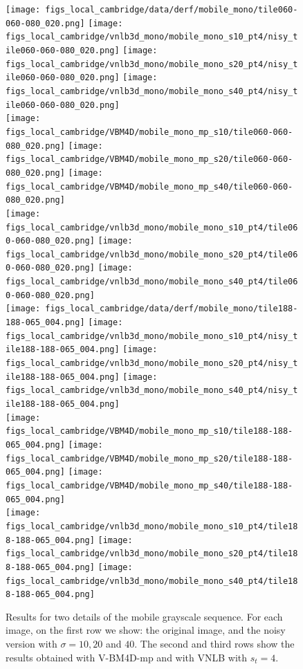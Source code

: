 \documentclass[10pt, journal, twocolumn, final, a4paper]{IEEEtran}
\begin{document}
\begin{figure}[htpb!]
	\centering
	\texttt{[image: figs\_local\_cambridge/data/derf/mobile\_mono/tile060-060-080\_020.png]}%
	\texttt{[image: figs\_local\_cambridge/vnlb3d\_mono/mobile\_mono\_s10\_pt4/nisy\_tile060-060-080\_020.png]}%
	\texttt{[image: figs\_local\_cambridge/vnlb3d\_mono/mobile\_mono\_s20\_pt4/nisy\_tile060-060-080\_020.png]}%
	\texttt{[image: figs\_local\_cambridge/vnlb3d\_mono/mobile\_mono\_s40\_pt4/nisy\_tile060-060-080\_020.png]}\\
	\hspace               {0.2\textwidth}%
	\texttt{[image: figs\_local\_cambridge/VBM4D/mobile\_mono\_mp\_s10/tile060-060-080\_020.png]}%
	\texttt{[image: figs\_local\_cambridge/VBM4D/mobile\_mono\_mp\_s20/tile060-060-080\_020.png]}%
	\texttt{[image: figs\_local\_cambridge/VBM4D/mobile\_mono\_mp\_s40/tile060-060-080\_020.png]}\\
	\hspace               {0.2\textwidth}%
	\texttt{[image: figs\_local\_cambridge/vnlb3d\_mono/mobile\_mono\_s10\_pt4/tile060-060-080\_020.png]}%
	\texttt{[image: figs\_local\_cambridge/vnlb3d\_mono/mobile\_mono\_s20\_pt4/tile060-060-080\_020.png]}%
	\texttt{[image: figs\_local\_cambridge/vnlb3d\_mono/mobile\_mono\_s40\_pt4/tile060-060-080\_020.png]}\\

	\vspace{.1cm}
	\texttt{[image: figs\_local\_cambridge/data/derf/mobile\_mono/tile188-188-065\_004.png]}%
	\texttt{[image: figs\_local\_cambridge/vnlb3d\_mono/mobile\_mono\_s10\_pt4/nisy\_tile188-188-065\_004.png]}%
	\texttt{[image: figs\_local\_cambridge/vnlb3d\_mono/mobile\_mono\_s20\_pt4/nisy\_tile188-188-065\_004.png]}%
	\texttt{[image: figs\_local\_cambridge/vnlb3d\_mono/mobile\_mono\_s40\_pt4/nisy\_tile188-188-065\_004.png]}\\
	\hspace               {0.2\textwidth}%
	\texttt{[image: figs\_local\_cambridge/VBM4D/mobile\_mono\_mp\_s10/tile188-188-065\_004.png]}%
	\texttt{[image: figs\_local\_cambridge/VBM4D/mobile\_mono\_mp\_s20/tile188-188-065\_004.png]}%
	\texttt{[image: figs\_local\_cambridge/VBM4D/mobile\_mono\_mp\_s40/tile188-188-065\_004.png]}\\
	\hspace               {0.2\textwidth}%
	\texttt{[image: figs\_local\_cambridge/vnlb3d\_mono/mobile\_mono\_s10\_pt4/tile188-188-065\_004.png]}%
	\texttt{[image: figs\_local\_cambridge/vnlb3d\_mono/mobile\_mono\_s20\_pt4/tile188-188-065\_004.png]}%
	\texttt{[image: figs\_local\_cambridge/vnlb3d\_mono/mobile\_mono\_s40\_pt4/tile188-188-065\_004.png]}\\
	\caption{Results for two details of the mobile grayscale sequence. For each
	image, on the first row we show: the original image, and the noisy version
	with $\sigma = 10,20$ and $40$. The second and third rows show the results
	obtained with V-BM4D-mp and with VNLB with $s_t = 4$.}
	\label{fig:results_mobile_mono}
\end{figure}
\end{document}
